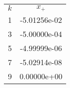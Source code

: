 \begin{tabular}{cc}
\hline
 $k$ & $x_+$ \\
1 &-5.01256e-02\\
3 &-5.00000e-04\\
5 &-4.99999e-06\\
7 &-5.02914e-08\\
9 &0.00000e+00\\
\hline
\end{tabular}
